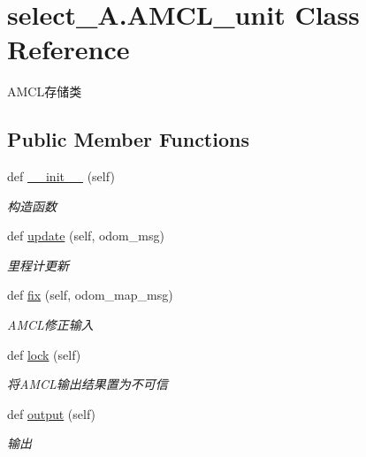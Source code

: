 \hypertarget{classselect___a_1_1_a_m_c_l__unit}{}\section{select\+\_\+\+A.\+A\+M\+C\+L\+\_\+unit Class Reference}
\label{classselect___a_1_1_a_m_c_l__unit}


A\+M\+C\+L存储类  


\subsection*{Public Member Functions}
\begin{DoxyCompactItemize}
\item 
def \hyperlink{classselect___a_1_1_a_m_c_l__unit_a8900541517098e5491ed40c4d282beb8}{\+\_\+\+\_\+init\+\_\+\+\_\+} (self)
\begin{DoxyCompactList}\small\item\em 构造函数 \end{DoxyCompactList}\item 
def \hyperlink{classselect___a_1_1_a_m_c_l__unit_aee2f9bf2fbf4ad2a59d32b00533e33ab}{update} (self, odom\+\_\+msg)
\begin{DoxyCompactList}\small\item\em 里程计更新 \end{DoxyCompactList}\item 
def \hyperlink{classselect___a_1_1_a_m_c_l__unit_a586f600a47a66f0e69275fe2fcc8fd65}{fix} (self, odom\+\_\+map\+\_\+msg)
\begin{DoxyCompactList}\small\item\em A\+M\+C\+L修正输入 \end{DoxyCompactList}\item 
def \hyperlink{classselect___a_1_1_a_m_c_l__unit_a1889f634cc13d1c3a83eb45c5ef22d54}{lock} (self)
\begin{DoxyCompactList}\small\item\em 将\+A\+M\+C\+L输出结果置为不可信 \end{DoxyCompactList}\item 
def \hyperlink{classselect___a_1_1_a_m_c_l__unit_a5c23f7326d10c0224a5115a8bffbb64e}{output} (self)
\begin{DoxyCompactList}\small\item\em 输出 \end{DoxyCompactList}\end{DoxyCompactItemize}
